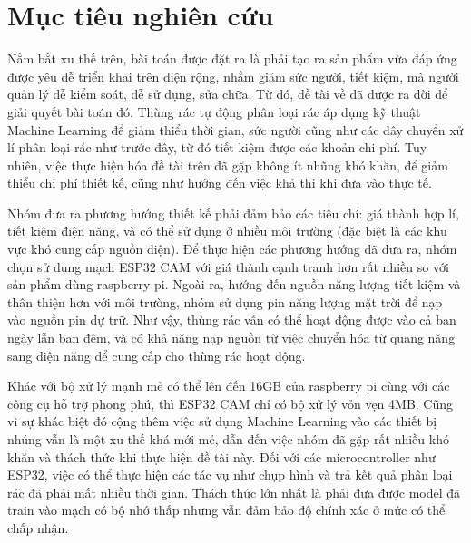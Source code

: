 \section{Mục tiêu nghiên cứu}
Nắm bắt xu thế trên, bài toán được đặt ra là phải tạo ra sản phẩm vừa đáp ứng được yêu dễ triển khai trên diện rộng, nhằm giảm sức người, tiết kiệm, mà người quản lý dễ kiểm soát, dễ sử dụng, sửa chữa.
Từ đó, đề tài về  đã được ra đời để giải quyết bài toán đó. 
Thùng rác tự động phân loại rác áp dụng kỹ thuật Machine Learning để giảm thiểu thời gian, sức người cũng như các dây chuyển xử lí phân loại rác như trước đây, từ đó tiết kiệm được các khoản chi phí.
Tuy nhiên, việc thực hiện hóa đề tài trên đã gặp không ít nhũng khó khăn, để giảm thiểu chi phí thiết kế, cũng như hướng đến việc khả thi khi đưa vào thực tế.

Nhóm đưa ra phương hướng thiết kế phải đảm bảo các tiêu chí: giá thành hợp lí, tiết kiệm điện năng, và có thể sử dụng ở nhiều môi trường (đặc biệt là các khu vực khó cung cấp nguồn điện).
Để thực hiện các phương hướng đã đưa ra, nhóm chọn sử dụng mạch ESP32 CAM với giá thành cạnh tranh hơn rất nhiều so với sản phẩm dùng raspberry pi.
Ngoài ra, hướng đến nguồn năng lượng tiết kiệm và thân thiện hơn với môi trường, nhóm sử dụng pin năng lượng mặt trời để nạp vào nguồn pin dự trữ.
Như vậy, thùng rác vẫn có thể hoạt động được vào cả ban ngày lẫn ban đêm, và có khả năng nạp nguồn từ việc chuyển hóa từ quang năng sang điện năng để cung cấp cho thùng rác hoạt động.

Khác với bộ xử lý mạnh mẻ có thể lên đến 16GB của raspberry pi cùng với các công cụ hỗ trợ phong phú, thì ESP32 CAM chỉ có bộ xử lý vỏn vẹn 4MB.
Cũng vì sự khác biệt đó cộng thêm việc sử dụng Machine Learning vào các thiết bị nhúng vẫn là một xu thế khá mới mẻ, dẫn đến việc nhóm đã gặp rất nhiều khó khăn và thách thức khi thực hiện đề tài này.
Đối với các microcontroller như ESP32, việc có thể thực hiện các tác vụ như chụp hình và trả kết quả phân loại rác đã phải mất nhiều thời gian.
Thách thức lớn nhất là phải đưa được model đã train vào mạch có bộ nhớ thấp nhưng vẫn đảm bảo độ chính xác ở mức có thể chấp nhận. 

